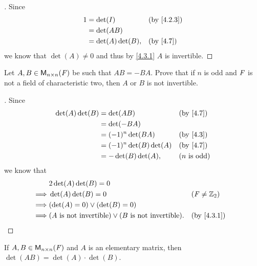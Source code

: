 \begin{proof}[]
  Since
  \begin{align*}
    1 & = \det(I)          &  & \by{4.2.3} \\
      & = \det(AB)                         \\
      & = \det(A) \det(B), &  & \by{4.7}
  \end{align*}
  we know that \(\det(A) \neq 0\) and thus by \cref{4.3.1} \(A\) is invertible.
\end{proof}

\begin{ex}\label{ex:4.3.17}
  Let \(A, B \in \ms[n][n][\F]\) be such that \(AB = -BA\).
  Prove that if \(n\) is odd and \(\mathit{F}\) is not a field of characteristic two, then \(A\) or \(B\) is not invertible.
\end{ex}

\begin{proof}[]
  Since
  \begin{align*}
    \det(A) \det(B) & = \det(AB)               &  & \by{4.7}              \\
                    & = \det(-BA)                                         \\
                    & = (-1)^n \det(BA)        &  & \by{4.3}              \\
                    & = (-1)^n \det(B) \det(A) &  & \by{4.7}              \\
                    & = -\det(B) \det(A),      &  & \text{(\(n\) is odd)}
  \end{align*}
  we know that
  \begin{align*}
             & 2 \det(A) \det(B) = 0                                                                 \\
    \implies & \det(A) \det(B) = 0                                               &  & (\F \neq \Z_2) \\
    \implies & (\det(A) = 0) \lor (\det(B) = 0)                                                      \\
    \implies & (A \text{ is not invertible}) \lor (B \text{ is not invertible}). &  & \by{4.3.1}
  \end{align*}
\end{proof}

\begin{ex}\label{ex:4.3.18}
  If \(A, B \in \ms[n][n][\F]\) and \(A\) is an elementary matrix, then \(\det(AB) = \det(A) \cdot \det(B)\).
\end{ex}

